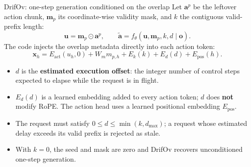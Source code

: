 \documentclass[aspectratio=169,10pt]{beamer}
\newcommand{\vect}[1]{\mathbf{#1}}
\begin{document}
\begin{frame}{DrifOv: one-step generation conditioned on the overlap}
  \small
  Let $\vect{a}^{p}$ be the leftover action chunk, $\vect{m}_p$ its
  coordinate-wise validity mask, and $k$ the contiguous valid-prefix length:
  \[
    \vect{u}
    =
    \vect{m}_p\odot\vect{a}^{p},
    \qquad
    \tilde{\vect{a}}
    =
    f_\theta(\vect{u},\vect{m}_p,k,d\mid\vect{o}).
  \]
  The code injects the overlap metadata directly into each action token:
  \[
    \vect{x}_h
    =
    E_{\mathrm{act}}(u_h,0)
    +W_m m_{p,h}
    +E_k(k)
    +E_d(d)
    +E_{\mathrm{pos}}(h).
  \]

  \begin{itemize}
    \item $d$ is the \textbf{estimated execution offset}: the integer number of
          control steps expected to elapse while the request is in flight.
    \item $E_d(d)$ is a learned embedding added to every action token; $d$ does
          \textbf{not} modify RoPE. The action head uses a learned positional
          embedding $E_{\mathrm{pos}}$.
    \item The request must satisfy $0\le d\le\min(k,d_{\max})$; a request whose
          estimated delay exceeds its valid prefix is rejected as stale.
    \item With $k=0$, the seed and mask are zero and DrifOv recovers
          unconditioned one-step generation.
  \end{itemize}
\end{frame}
\end{document}

